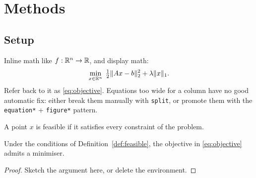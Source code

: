 \section{Methods}
\label{sec:methods}

\subsection{Setup}

Inline math like $f : \mathbb{R}^n \to \mathbb{R}$, and display math:
\begin{equation}
  \label{eq:objective}
  \min_{x \in \mathbb{R}^n} \; \tfrac{1}{2}\|Ax - b\|_2^2 + \lambda \|x\|_1 .
\end{equation}
Refer back to it as \eqref{eq:objective}. Equations too wide for a column
have no good automatic fix: either break them manually with \texttt{split},
or promote them with the \texttt{equation*} + \texttt{figure*} pattern.

\begin{definition}
\label{def:feasible}
A point $x$ is feasible if it satisfies every constraint of the problem.
\end{definition}

\begin{theorem}
\label{thm:main}
Under the conditions of Definition~\ref{def:feasible}, the objective in
\eqref{eq:objective} admits a minimiser.
\end{theorem}

\begin{proof}
Sketch the argument here, or delete the environment.
\end{proof}

